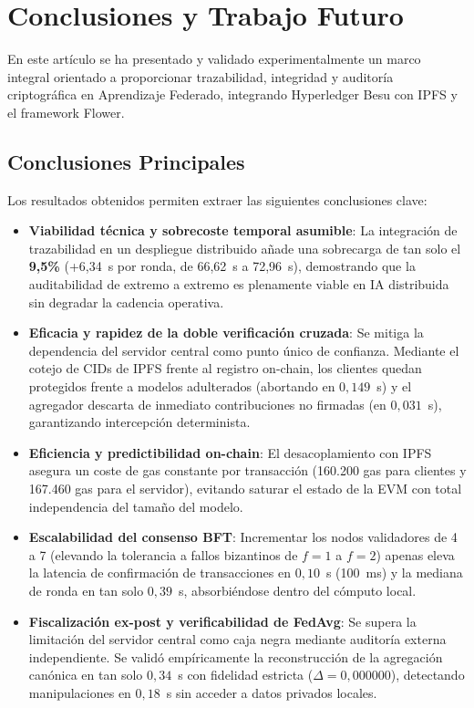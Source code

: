 \section{Conclusiones y Trabajo Futuro}
\label{sec:conclusiones}

En este artículo se ha presentado y validado experimentalmente un marco integral orientado a proporcionar trazabilidad, integridad y auditoría criptográfica en Aprendizaje Federado, integrando Hyperledger Besu con IPFS y el framework Flower.

\subsection{Conclusiones Principales}
Los resultados obtenidos permiten extraer las siguientes conclusiones clave:
\begin{itemize}
    \item \textbf{Viabilidad técnica y sobrecoste temporal asumible}: La integración de trazabilidad en un despliegue distribuido añade una sobrecarga de tan solo el \textbf{9,5\%} (+6,34~s por ronda, de 66,62~s a 72,96~s), demostrando que la auditabilidad de extremo a extremo es plenamente viable en IA distribuida sin degradar la cadencia operativa.
    \item \textbf{Eficacia y rapidez de la doble verificación cruzada}: Se mitiga la dependencia del servidor central como punto único de confianza. Mediante el cotejo de CIDs de IPFS frente al registro on-chain, los clientes quedan protegidos frente a modelos adulterados (abortando en $0{,}149$~s) y el agregador descarta de inmediato contribuciones no firmadas (en $0{,}031$~s), garantizando intercepción determinista.
    \item \textbf{Eficiencia y predictibilidad on-chain}: El desacoplamiento con IPFS asegura un coste de gas constante por transacción (160.200 gas para clientes y 167.460 gas para el servidor), evitando saturar el estado de la EVM con total independencia del tamaño del modelo.
    \item \textbf{Escalabilidad del consenso BFT}: Incrementar los nodos validadores de 4 a 7 (elevando la tolerancia a fallos bizantinos de $f=1$ a $f=2$) apenas eleva la latencia de confirmación de transacciones en $0{,}10$~s (100~ms) y la mediana de ronda en tan solo $0{,}39$~s, absorbiéndose dentro del cómputo local.
    \item \textbf{Fiscalización ex-post y verificabilidad de FedAvg}: Se supera la limitación del servidor central como caja negra mediante auditoría externa independiente. Se validó empíricamente la reconstrucción de la agregación canónica en tan solo $0{,}34$~s con fidelidad estricta ($\Delta = 0{,}000000$), detectando manipulaciones en $0{,}18$~s sin acceder a datos privados locales.
\end{itemize}

